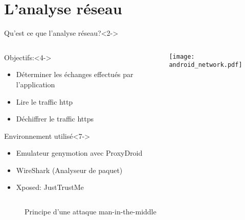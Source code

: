 \documentclass[aspectratio=1610, handout]{beamer}%
\begin{document}
 
\section{L'analyse réseau}
\begin{frame}[t]
  \slidetitle[]
  \begin{block}{Qu'est ce que l'analyse réseau?}<2->
    \end{block}
  \begin{columns}
    \begin{column}{0.7\linewidth}
      \begin{block}{Objectifs:}<4->
        \begin{itemize}
        \item<5-> Déterminer les échanges effectués par l'application
        \item<6-> Lire le traffic http
        \item<7-> Déchiffrer le traffic https
        \end{itemize}
      \end{block}
      \begin{block}{Environnement utilisé}<7->
        \begin{itemize}
          \item<8-> Emulateur genymotion avec ProxyDroid
          \item<9-> WireShark (Analyseur de paquet)
          \item<10-> Xposed: JustTrustMe
          \end{itemize}
      \end{block}    
    \end{column}
    \begin{column}{0.25\linewidth}
      \centering
      \texttt{[image: android\_network.pdf]}
    \end{column}
  \end{columns}
  \vfill
\end{frame}

\begin{frame}[t]
  \slidetitle[Principe]
  \begin{figure}
    \vspace{-0.65cm}
    
    \caption{Principe d'une attaque man-in-the-middle}
  \end{figure}
\end{frame}
\end{document}
